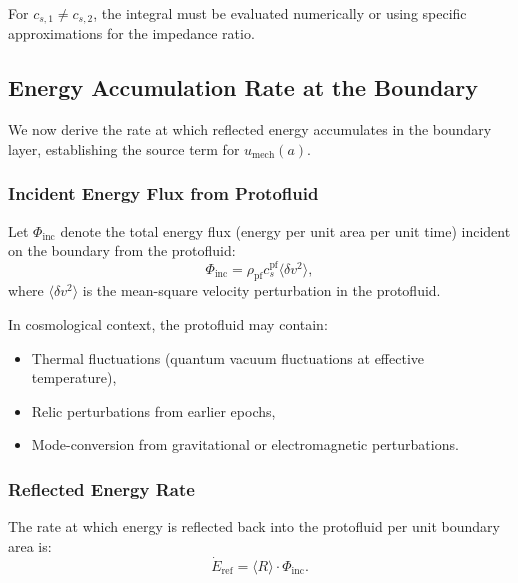 For $c_{s,1} \neq c_{s,2}$, the integral must be evaluated numerically or using specific approximations for the impedance ratio.

\subsection{Energy Accumulation Rate at the Boundary}
\label{app:energy_accumulation}

We now derive the rate at which reflected energy accumulates in the boundary layer, establishing the source term for $u_{\text{mech}}(a)$.

\subsubsection{Incident Energy Flux from Protofluid}

\begin{definition}
Let $\Phi_{\text{inc}}$ denote the total energy flux (energy per unit area per unit time) incident on the boundary from the protofluid:
\begin{equation}
\label{eq:incident_flux}
\Phi_{\text{inc}} = \rho_{\text{pf}} c_s^{\text{pf}} \langle \delta v^2 \rangle,
\end{equation}
where $\langle \delta v^2 \rangle$ is the mean-square velocity perturbation in the protofluid.
\end{definition}

In cosmological context, the protofluid may contain:
\begin{itemize}
    \item Thermal fluctuations (quantum vacuum fluctuations at effective temperature),
    \item Relic perturbations from earlier epochs,
    \item Mode-conversion from gravitational or electromagnetic perturbations.
\end{itemize}

\subsubsection{Reflected Energy Rate}

\begin{proposition}
\label{prop:reflection_rate}
The rate at which energy is reflected back into the protofluid per unit boundary area is:
\begin{equation}
\label{eq:reflection_rate}
\dot{E}_{\text{ref}} = \langle R \rangle \cdot \Phi_{\text{inc}}.
\end{equation}
\end{proposition}

